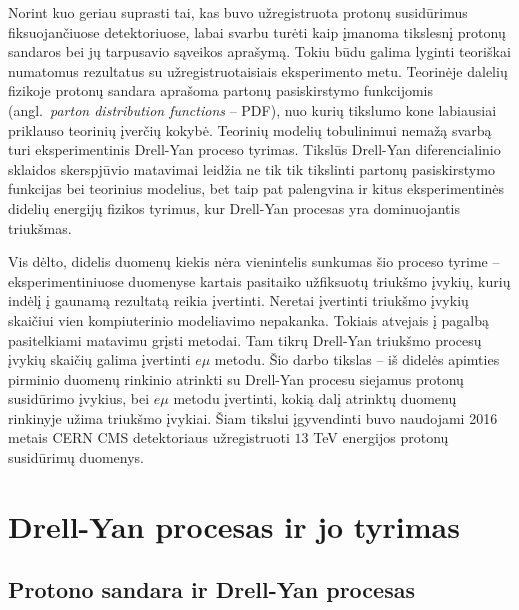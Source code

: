 \documentclass[a4paper, 12pt]{article}
\newcommand{\emu}{e\mu}
\begin{document}
Norint kuo geriau suprasti tai, kas buvo užregistruota protonų susidūrimus
fiksuojančiuose detektoriuose, labai svarbu turėti kaip įmanoma tikslesnį protonų
sandaros bei jų tarpusavio sąveikos aprašymą.
Tokiu būdu galima lyginti teoriškai numatomus rezultatus su užregistruotaisiais eksperimento
metu.
Teorinėje dalelių fizikoje protonų sandara aprašoma partonų pasiskirstymo funkcijomis
(angl.\ \textit{parton distribution functions} -- PDF), nuo kurių tikslumo kone labiausiai
priklauso teorinių įverčių kokybė.
Teorinių modelių tobulinimui nemažą svarbą turi eksperimentinis Drell-Yan proceso tyrimas.
Tikslūs Drell-Yan diferencialinio sklaidos skerspjūvio matavimai leidžia ne tik tik tikslinti
partonų pasiskirstymo funkcijas bei teorinius modelius, bet taip pat palengvina ir kitus
eksperimentinės didelių energijų fizikos tyrimus, kur Drell-Yan procesas yra dominuojantis triukšmas.

Vis dėlto, didelis duomenų kiekis nėra vienintelis sunkumas šio proceso tyrime -- eksperimentiniuose
duomenyse kartais pasitaiko užfiksuotų triukšmo įvykių, kurių indėlį į gaunamą rezultatą reikia
įvertinti.
Neretai įvertinti triukšmo įvykių skaičiui vien kompiuterinio modeliavimo nepakanka.
Tokiais atvejais į pagalbą pasitelkiami matavimu grįsti metodai.
Tam tikrų Drell-Yan triukšmo procesų įvykių skaičių galima įvertinti $\emu$ metodu.
Šio darbo tikslas -- iš didelės apimties pirminio duomenų rinkinio atrinkti su Drell-Yan
procesu siejamus protonų susidūrimo įvykius, bei $\emu$ metodu įvertinti, kokią dalį atrinktų
duomenų rinkinyje užima triukšmo įvykiai. Šiam tikslui įgyvendinti buvo naudojami 2016 metais
CERN CMS detektoriaus užregistruoti $13$ TeV energijos protonų susidūrimų duomenys.

\clearpage

\section{Drell-Yan procesas ir jo tyrimas}


\subsection{Protono sandara ir Drell-Yan procesas}
\end{document}
